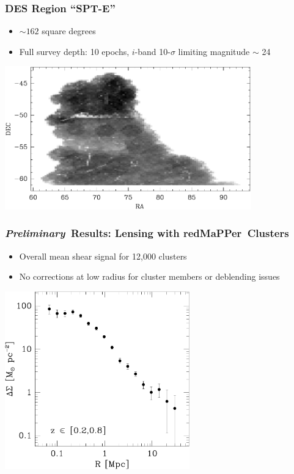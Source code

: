 \documentclass{beamer}
\newcommand{\redmapper}{redMaPPer}
\newcommand{\prelim}{{\bf{\it Preliminary}}}
\begin{document}
\frame
{
    \frametitle{DES Region ``SPT-E''}

    \begin{itemize}

        \item $\sim 162$ square degrees

        \item Full survey depth: 10 epochs, $i$-band 10-$\sigma$ limiting magnitude
            $\sim$ 24

    \end{itemize}

    \begin{center}
        \includegraphics[width=0.8\textwidth]{spte-greyscale-density-010000000.pdf}
    \end{center}

}

\frame
{
    \frametitle{\prelim\ Results: Lensing with \redmapper\ Clusters}

    \begin{itemize}

        \item Overall mean shear signal for 12,000 clusters

        \item No corrections at low radius for cluster members or deblending issues

    \end{itemize}

    \begin{center}
        \includegraphics[width=0.6\textwidth]{run-rm008-bin-zwide-jack.pdf}
    \end{center}

}
\end{document}
